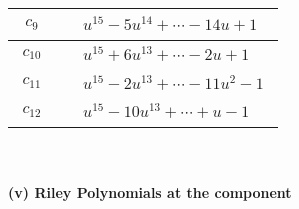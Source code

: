 \documentclass[1p]{elsarticle_modified}
\theoremstyle{definition}
\begin{document}
\begin{tabular}{m{50pt}|m{274pt}}
\hline $$\begin{aligned}c_{9}\end{aligned}$$&$\begin{aligned}
&u^{15}-5 u^{14}+\cdots-14 u+1
\end{aligned}$\\
\hline $$\begin{aligned}c_{10}\end{aligned}$$&$\begin{aligned}
&u^{15}+6 u^{13}+\cdots-2 u+1
\end{aligned}$\\
\hline $$\begin{aligned}c_{11}\end{aligned}$$&$\begin{aligned}
&u^{15}-2 u^{13}+\cdots-11 u^2-1
\end{aligned}$\\
\hline $$\begin{aligned}c_{12}\end{aligned}$$&$\begin{aligned}
&u^{15}-10 u^{13}+\cdots+u-1
\end{aligned}$\\
\hline
\end{tabular}\\~\\
\newpage\renewcommand{\arraystretch}{1}
\flushleft \textbf{(v) Riley Polynomials at the component}\newline \\
\end{document}
